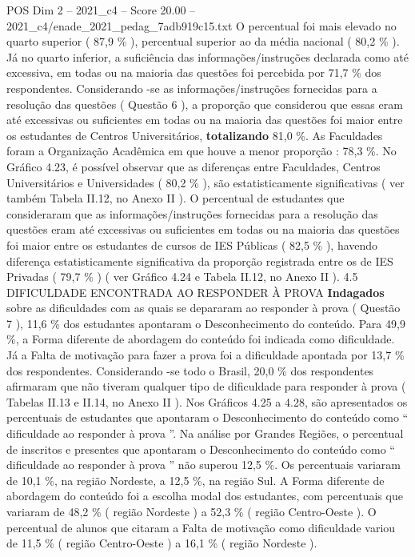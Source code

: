 \begin{textsample}{POS Dim 2 – 2021\_c4 – Score 20.00 – 2021\_c4/enade\_2021\_pedag\_7adb919c15.txt}
O percentual foi mais elevado no quarto superior ( 87,9 \% ), percentual superior ao da média nacional ( 80,2 \% ).
Já no quarto inferior, a suficiência das informações/instruções declarada como até excessiva, em todas ou na maioria das questões foi percebida por 71,7 \% dos respondentes.
Considerando -se as informações/instruções fornecidas para a resolução das questões ( Questão 6 ), a proporção que considerou que essas eram até excessivas ou suficientes em todas ou na maioria das questões foi maior entre os estudantes de Centros Universitários, \textbf{totalizando} 81,0 \%.
As Faculdades foram a Organização Acadêmica em que houve a menor proporção : 78,3 \%.
No Gráfico 4.23, é possível observar que as diferenças entre Faculdades, Centros Universitários e Universidades ( 80,2 \% ), são estatisticamente significativas ( ver também Tabela II.12, no Anexo II ).
O percentual de estudantes que consideraram que as informações/instruções fornecidas para a resolução das questões eram até excessivas ou suficientes em todas ou na maioria das questões foi maior entre os estudantes de cursos de IES Públicas ( 82,5 \% ), havendo diferença estatisticamente significativa da proporção registrada entre os de IES Privadas ( 79,7 \% ) ( ver Gráfico 4.24 e Tabela II.12, no Anexo II ). 4.5 DIFICULDADE ENCONTRADA AO RESPONDER À PROVA \textbf{Indagados} sobre as dificuldades com as quais se depararam ao responder à prova ( Questão 7 ), 11,6 \% dos estudantes apontaram o Desconhecimento do conteúdo.
Para 49,9 \%, a Forma diferente de abordagem do conteúdo foi indicada como dificuldade.
Já a Falta de motivação para fazer a prova foi a dificuldade apontada por 13,7 \% dos respondentes.
Considerando -se todo o Brasil, 20,0 \% dos respondentes afirmaram que não tiveram qualquer tipo de dificuldade para responder à prova ( Tabelas II.13 e II.14, no Anexo II ).
Nos Gráficos 4.25 a 4.28, são apresentados os percentuais de estudantes que apontaram o Desconhecimento do conteúdo como “ dificuldade ao responder à prova ”.
Na análise por Grandes Regiões, o percentual de inscritos e presentes que apontaram o Desconhecimento do conteúdo como “ dificuldade ao responder à prova ” não superou 12,5 \%.
Os percentuais variaram de 10,1 \%, na região Nordeste, a 12,5 \%, na região Sul.
A Forma diferente de abordagem do conteúdo foi a escolha modal dos estudantes, com percentuais que variaram de 48,2 \% ( região Nordeste ) a 52,3 \% ( região Centro-Oeste ).
O percentual de alunos que citaram a Falta de motivação como dificuldade variou de 11,5 \% ( região Centro-Oeste ) a 16,1 \% ( região Nordeste ).

\end{textsample}
